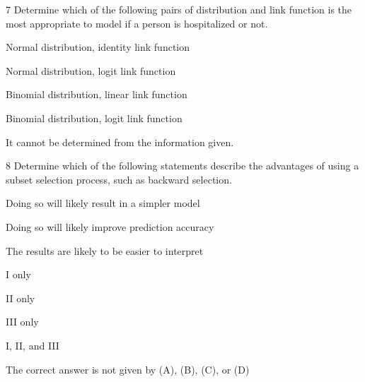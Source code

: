 \begin{question}{7}
Determine which of the following pairs of distribution and link function is the most appropriate to model if a person is hospitalized or not.

\begin{choices}
\item Normal distribution, identity link function
\item Normal distribution, logit link function
\item Binomial distribution, linear link function
\item Binomial distribution, logit link function
\item It cannot be determined from the information given.
\end{choices}
\end{question}

\begin{question}{8}
Determine which of the following statements describe the advantages of using a subset selection process, such as backward selection.
\begin{statements}
\item Doing so will likely result in a simpler model
\item Doing so will likely improve prediction accuracy
\item The results are likely to be easier to interpret
\end{statements}

\begin{choices}
\item I only
\item II only
\item III only
\item I, II, and III
\item The correct answer is not given by (A), (B), (C), or (D)
\end{choices}
\end{question}

